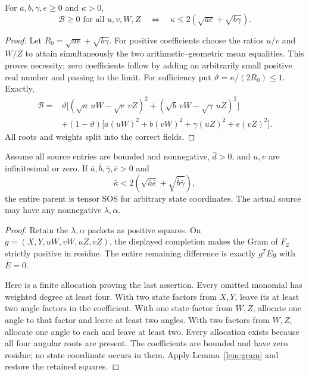\begin{proposition}
For $a,b,\gamma,e\ge0$ and $\kappa>0$,
\[
\mathcal B\ge0\text{ for all }u,v,W,Z
\quad\Longleftrightarrow\quad
\kappa\le2(\sqrt{ae}+\sqrt{b\gamma}).
\]
\end{proposition}
\begin{proof}
Let $R_0=\sqrt{ae}+\sqrt{b\gamma}$. For positive coefficients choose the ratios $u/v$ and $W/Z$ to attain simultaneously the two arithmetic--geometric mean equalities. This proves necessity; zero coefficients follow by adding an arbitrarily small positive real number and passing to the limit. For sufficiency put $\vartheta=\kappa/(2R_0)\le1$. Exactly,
\begin{align*}
\mathcal B={}&\vartheta\big[(\sqrt a\,uW-\sqrt e\,vZ)^2
 +(\sqrt b\,vW-\sqrt\gamma\,uZ)^2\big]\\
&+(1-\vartheta)\big[a(uW)^2+b(vW)^2+\gamma(uZ)^2+e(vZ)^2\big].
\end{align*}
All roots and weights split into the correct fields.
\end{proof}

\begin{theorem}
Assume all source entries are bounded and nonnegative, $\bar d>0$, and $u,v$ are infinitesimal or zero. If $\bar a,\bar b,\bar\gamma,\bar e>0$ and
\[
\bar\kappa<2(\sqrt{\bar a\bar e}+\sqrt{\bar b\bar\gamma}),
\]
the entire parent is tensor SOS for arbitrary state coordinates. The actual source may have any nonnegative $\lambda,\alpha$.
\end{theorem}
\begin{proof}
Retain the $\lambda,\alpha$ packets as positive squares. On
$g=(X,Y,uW,vW,uZ,vZ)$, the displayed completion makes the Gram of $F_2$ strictly positive in residue. The entire remaining difference is exactly $g^TEg$ with $\bar E=0$.

Here is a finite allocation proving the last assertion. Every omitted monomial has weighted degree at least four. With two state factors from $X,Y$, leave its at least two angle factors in the coefficient. With one state factor from $W,Z$, allocate one angle to that factor and leave at least two angles. With two factors from $W,Z$, allocate one angle to each and leave at least two. Every allocation exists because all four angular roots are present. The coefficients are bounded and have zero residue; no state coordinate occurs in them. Apply Lemma~\ref{lem:gram} and restore the retained squares.
\end{proof}

